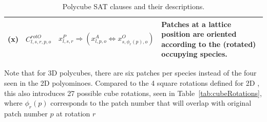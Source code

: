 \begin{table}[h!]
\begin{tabular}{|c|l|l|p{5cm}|}
        (x) & \(C^{rotO}_{l,s,r,p,o}\) & \(x_{l,s,r}^{P} \Rightarrow \left(x_{l,p,o}^{A} \Leftrightarrow x_{s, \phi_r(p), o}^{O}\right)\) & \small{Patches at a lattice position are oriented according to the (rotated) occupying species.} \\ %
        \hline
    \end{tabular}
    \caption{Polycube SAT clauses and their descriptions.}
    \label{tab:sat_clauses}
    \end{table}

Note that for 3D polycubes, there are six patches per species instead of the four seen in the 2D polyominoes. Compared to the 4 square rotations defined for 2D \cite{romano2020designing}, this also introduces 27 possible cube rotations, seen in Table~\ref{tab:cubeRotations}, where $\phi_r(p)$ corresponds to the patch number that will overlap with original patch number $p$ at rotation $r$


